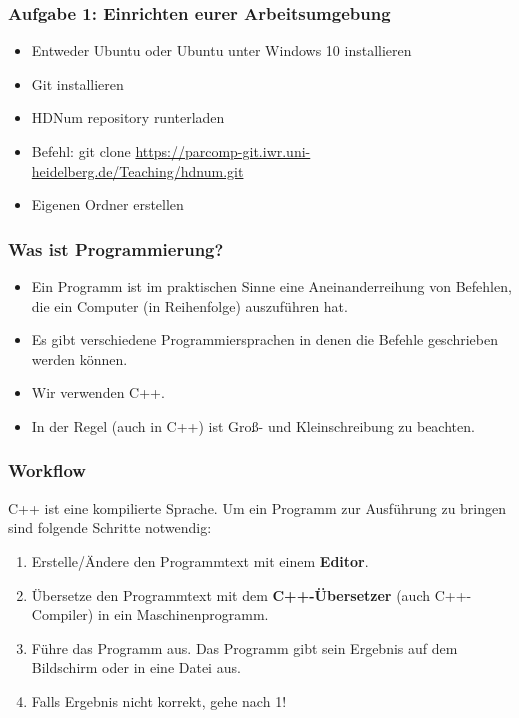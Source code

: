 \documentclass[ignorenonframetext,12pt]{beamer}
\theoremstyle{definition}
\theoremstyle{definition}
\begin{document}

\begin{frame}[fragile]
\frametitle{Aufgabe 1: Einrichten eurer Arbeitsumgebung}
\begin{itemize}
\item Entweder Ubuntu oder Ubuntu unter Windows 10 installieren
\item Git installieren
\item HDNum repository runterladen
\item Befehl: git clone \url{https://parcomp-git.iwr.uni-heidelberg.de/Teaching/hdnum.git}
\item Eigenen Ordner erstellen
\end{itemize}
\end{frame}

\begin{frame}[fragile]
\frametitle{Was ist Programmierung?}
\begin{itemize}
\item Ein Programm ist im praktischen Sinne eine Aneinanderreihung von Befehlen,
die ein Computer (in Reihenfolge) auszuführen hat.
\item Es gibt verschiedene Programmiersprachen in denen die Befehle geschrieben werden können.
\item Wir verwenden C++.
\item In der Regel (auch in C++) ist Gro\ss - und Kleinschreibung zu beachten.
\end{itemize}
\end{frame}

\begin{frame}[fragile]
\frametitle{Workflow}
C++ ist eine \glqq{}kompilierte\grqq{} Sprache. Um ein Programm zur
Ausführung zu bringen sind folgende Schritte notwendig:
\begin{enumerate}
\item Erstelle/Ändere den Programmtext mit einem \textbf{Editor}.
\item Übersetze den Programmtext mit dem \textbf{C++-Übersetzer}
  (auch C++-Compiler) in ein Maschinenprogramm.
\item Führe das Programm aus. Das Programm gibt sein Ergebnis auf dem
  Bildschirm oder in eine Datei aus.
\item Falls Ergebnis nicht korrekt, gehe nach 1!
\end{enumerate}
\end{frame}
\end{document}
